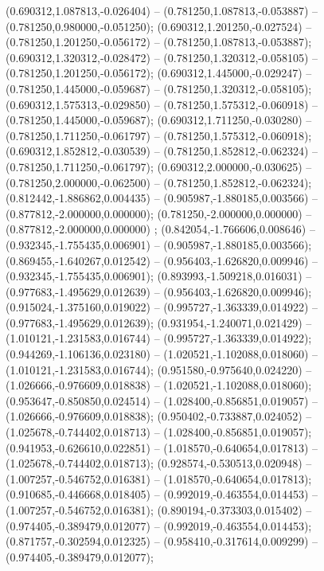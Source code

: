  (0.690312,1.087813,-0.026404) -- (0.781250,1.087813,-0.053887) -- (0.781250,0.980000,-0.051250);
 (0.690312,1.201250,-0.027524) -- (0.781250,1.201250,-0.056172) -- (0.781250,1.087813,-0.053887);
 (0.690312,1.320312,-0.028472) -- (0.781250,1.320312,-0.058105) -- (0.781250,1.201250,-0.056172);
 (0.690312,1.445000,-0.029247) -- (0.781250,1.445000,-0.059687) -- (0.781250,1.320312,-0.058105);
 (0.690312,1.575313,-0.029850) -- (0.781250,1.575312,-0.060918) -- (0.781250,1.445000,-0.059687);
 (0.690312,1.711250,-0.030280) -- (0.781250,1.711250,-0.061797) -- (0.781250,1.575312,-0.060918);
 (0.690312,1.852812,-0.030539) -- (0.781250,1.852812,-0.062324) -- (0.781250,1.711250,-0.061797);
 (0.690312,2.000000,-0.030625) -- (0.781250,2.000000,-0.062500) -- (0.781250,1.852812,-0.062324);
 (0.812442,-1.886862,0.004435) -- (0.905987,-1.880185,0.003566) -- (0.877812,-2.000000,0.000000);
 (0.781250,-2.000000,0.000000) -- (0.877812,-2.000000,0.000000) ;
 (0.842054,-1.766606,0.008646) -- (0.932345,-1.755435,0.006901) -- (0.905987,-1.880185,0.003566);
 (0.869455,-1.640267,0.012542) -- (0.956403,-1.626820,0.009946) -- (0.932345,-1.755435,0.006901);
 (0.893993,-1.509218,0.016031) -- (0.977683,-1.495629,0.012639) -- (0.956403,-1.626820,0.009946);
 (0.915024,-1.375160,0.019022) -- (0.995727,-1.363339,0.014922) -- (0.977683,-1.495629,0.012639);
 (0.931954,-1.240071,0.021429) -- (1.010121,-1.231583,0.016744) -- (0.995727,-1.363339,0.014922);
 (0.944269,-1.106136,0.023180) -- (1.020521,-1.102088,0.018060) -- (1.010121,-1.231583,0.016744);
 (0.951580,-0.975640,0.024220) -- (1.026666,-0.976609,0.018838) -- (1.020521,-1.102088,0.018060);
 (0.953647,-0.850850,0.024514) -- (1.028400,-0.856851,0.019057) -- (1.026666,-0.976609,0.018838);
 (0.950402,-0.733887,0.024052) -- (1.025678,-0.744402,0.018713) -- (1.028400,-0.856851,0.019057);
 (0.941953,-0.626610,0.022851) -- (1.018570,-0.640654,0.017813) -- (1.025678,-0.744402,0.018713);
 (0.928574,-0.530513,0.020948) -- (1.007257,-0.546752,0.016381) -- (1.018570,-0.640654,0.017813);
 (0.910685,-0.446668,0.018405) -- (0.992019,-0.463554,0.014453) -- (1.007257,-0.546752,0.016381);
 (0.890194,-0.373303,0.015402) -- (0.974405,-0.389479,0.012077) -- (0.992019,-0.463554,0.014453);
 (0.871757,-0.302594,0.012325) -- (0.958410,-0.317614,0.009299) -- (0.974405,-0.389479,0.012077);
